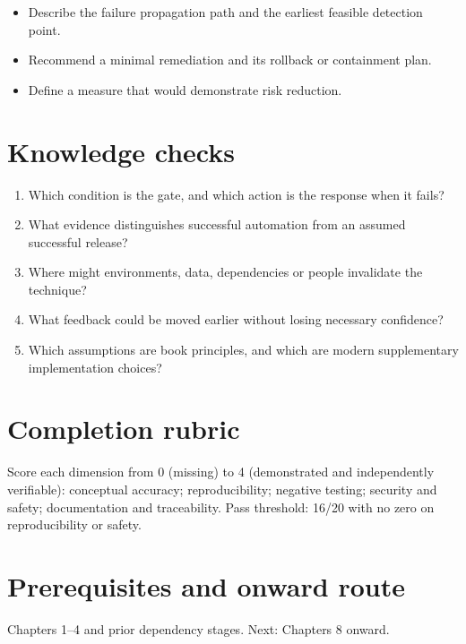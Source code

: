 \documentclass[10pt,letterpaper]{article}
\begin{document}
\begin{itemize}
\item Describe the failure propagation path and the earliest feasible detection point.
\item Recommend a minimal remediation and its rollback or containment plan.
\item Define a measure that would demonstrate risk reduction.
\end{itemize}

\section{Knowledge checks}
\begin{enumerate}
\item Which condition is the gate, and which action is the response when it fails?
\item What evidence distinguishes successful automation from an assumed successful release?
\item Where might environments, data, dependencies or people invalidate the technique?
\item What feedback could be moved earlier without losing necessary confidence?
\item Which assumptions are book principles, and which are modern supplementary implementation choices?
\end{enumerate}

\section{Completion rubric}
Score each dimension from 0 (missing) to 4 (demonstrated and independently verifiable): conceptual accuracy; reproducibility; negative testing; security and safety; documentation and traceability. Pass threshold: 16/20 with no zero on reproducibility or safety.


\section{Prerequisites and onward route}
Chapters 1--4 and prior dependency stages. Next: Chapters 8 onward.
\end{document}
